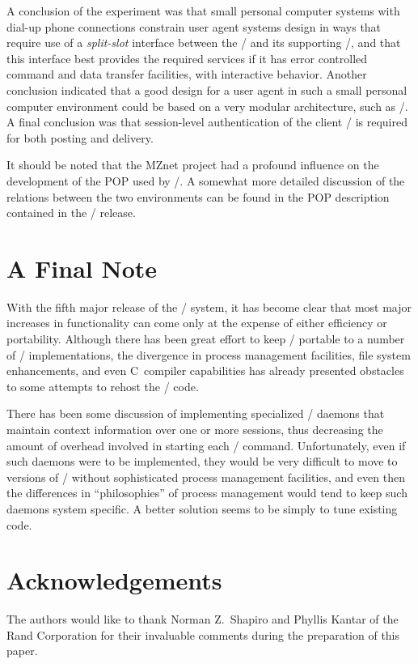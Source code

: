 A conclusion of the experiment was that small personal computer systems
with dial-up phone connections constrain user agent systems design in
ways that require use of a {\it split-slot} interface between the \UA/
and its supporting \MTA/, and that this interface
best provides the required services if it has error controlled command
and data transfer facilities, with interactive behavior. 
Another conclusion indicated that a good design for a user agent in such
a small personal computer
environment could be based on a very modular architecture,
such as \MH/.
A final conclusion was that session-level authentication of the client \UA/
is required for both posting and delivery.

It should be noted that the MZnet project had a profound influence on the
development of the POP used by \MH/.
A somewhat more detailed discussion of the relations between the two
environments can be found in the POP description contained
in the \MH/ release.

\section{A Final Note}				%
With the fifth major release of the \MH/ system,
it has become clear that most major increases in functionality can come
only at the expense of either efficiency or portability.
Although there has been great effort to keep \MH/ portable to a number of
\unix/ implementations,%
the divergence in process management facilities,
file system enhancements,
and even C~compiler capabilities
has already presented obstacles to some attempts to rehost the \MH/ code.

There has been some discussion of implementing specialized \MH/ daemons
that maintain context information over one or more sessions,
thus decreasing the amount of overhead involved in starting each \MH/ command.
Unfortunately,
even if such daemons were to be implemented,
they would be very difficult to move to versions of \unix/
without sophisticated process management facilities,
and even then the differences in ``philosophies''
of process management\cite{WJoy83,EOlse84}
would tend to keep such daemons system specific.
A better solution seems to be simply to tune existing code.

\section{Acknowledgements}
The authors would like to thank Norman Z.~Shapiro and
Phyllis Kantar of the Rand Corporation for their invaluable comments during
the preparation of this paper.

